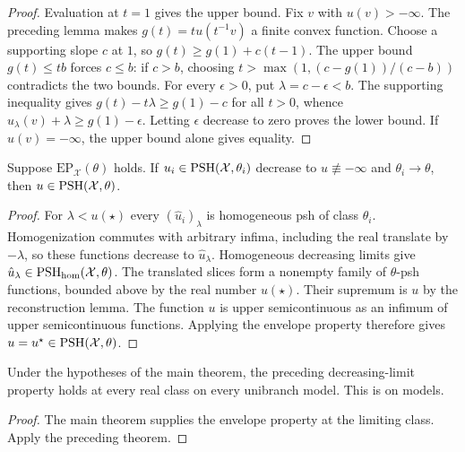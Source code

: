 \begin{proof}
Evaluation at $t=1$ gives the upper bound. Fix $v$ with $u(v)>-\infty$.
The preceding lemma makes $g(t)=t u(t^{-1}v)$ a finite convex function.
Choose a supporting slope $c$ at $1$, so
$g(t)\ge g(1)+c(t-1)$. The upper bound $g(t)\le tb$ forces $c\le b$:
if $c>b$, choosing $t>\max(1,(c-g(1))/(c-b))$ contradicts the two bounds.
For every $\epsilon>0$, put $\lambda=c-\epsilon<b$. The supporting inequality
gives $g(t)-t\lambda\ge g(1)-c$ for all $t>0$, whence
$\hat u_\lambda(v)+\lambda\ge g(1)-\epsilon$. Letting $\epsilon$ decrease
to zero proves the lower bound. If $u(v)=-\infty$, the upper bound alone
gives equality.
\end{proof}

\begin{theorem}\label{thm:ep-decreasing-limits}
\leanok
{}
Suppose $\mathrm{EP}_{\mathcal X}(\theta)$ holds. If
$u_i\in\operatorname{PSH}(\mathcal X,\theta_i)$ decrease to $u\not\equiv-\infty$ and
$\theta_i\to\theta$, then $u\in\operatorname{PSH}(\mathcal X,\theta)$.
\end{theorem}

\begin{proof}
For $\lambda<u(\star)$ every $(\hat u_i)_\lambda$ is homogeneous psh of
class $\theta_i$. Homogenization commutes with arbitrary infima, including
the real translate by $-\lambda$, so these functions decrease to
$\hat u_\lambda$. Homogeneous decreasing limits give
$\hat u_\lambda\in\operatorname{PSH}_{\mathrm{hom}}(\mathcal X,\theta)$.
The translated slices form a nonempty family of $\theta$-psh functions,
bounded above by the real number $u(\star)$. Their supremum is $u$ by the
reconstruction lemma. The function $u$ is upper semicontinuous as an infimum
of upper semicontinuous functions. Applying the envelope property therefore
gives $u=u^\star\in\operatorname{PSH}(\mathcal X,\theta)$.
\end{proof}

\begin{corollary}\label{cor:ep-unibranch-decreasing-limits}
\leanok
{}
Under the hypotheses of the main theorem, the preceding decreasing-limit
property holds at every real class on every unibranch model. This is
\cite[Corollary~8.4]{FHX} on models.
\end{corollary}

\begin{proof}
The main theorem supplies the envelope property at the limiting class.
Apply the preceding theorem.
\end{proof}
